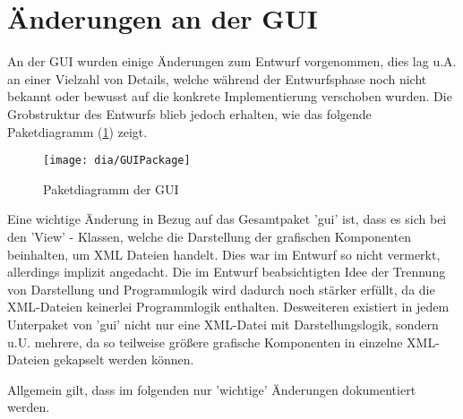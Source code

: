 \section{Änderungen an der GUI}
 An der GUI wurden einige Änderungen zum Entwurf vorgenommen, dies lag u.A. an einer Vielzahl von Details, welche während der Entwurfsphase noch nicht bekannt oder bewusst auf die konkrete Implementierung verschoben wurden. 
Die Grobstruktur des Entwurfs blieb jedoch erhalten, wie das folgende Paketdiagramm (\ref{fig:GUI}) zeigt.
\begin{figure}[h!]
	\centering
	\texttt{[image: dia/GUIPackage]}
	\caption{Paketdiagramm der GUI}
	\label{fig:GUI}
\end{figure}
	Eine wichtige Änderung in Bezug auf das Gesamtpaket 'gui' ist, dass es sich bei den 'View' - Klassen, welche die Darstellung der grafischen Komponenten beinhalten, um XML Dateien handelt. Dies war im Entwurf so nicht vermerkt, allerdings implizit angedacht. Die  im Entwurf beabsichtigten Idee der Trennung von Darstellung und Programmlogik wird dadurch noch stärker erfüllt, da die XML-Dateien keinerlei Programmlogik enthalten. Desweiteren existiert in jedem Unterpaket von 'gui' nicht nur eine XML-Datei mit Darstellungslogik, sondern u.U. mehrere, da so teilweise größere grafische Komponenten in einzelne XML-Dateien gekapselt werden können.
	
	Allgemein gilt, dass im folgenden nur 'wichtige' Änderungen dokumentiert werden.
